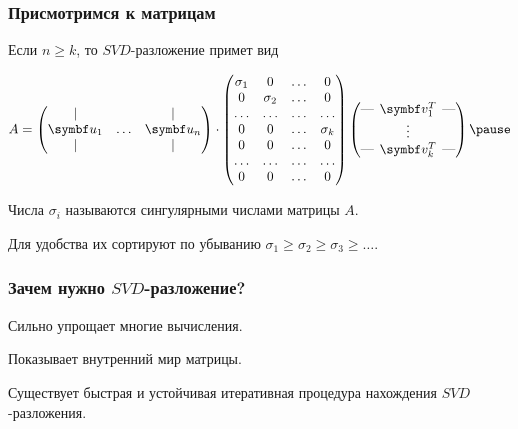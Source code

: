 \begin{frame}
  \frametitle{Присмотримся к матрицам}

  Если $n\geq k$, то $SVD$-разложение примет вид

  \[
  A = \begin{pmatrix}
    \vert &  & \vert \\
    \bu_1 & \ldots & \bu_n \\
    \vert &    & \vert \\
  \end{pmatrix} \cdot 
  \begin{pmatrix}
    \sigma_1 & 0 & \ldots & 0 \\
     0 & \sigma_2 & \ldots & 0 \\
    \ldots & \ldots & \ldots & \ldots \\
0 & 0 & \ldots & \sigma_k \\
0 & 0 & \ldots & 0 \\
\ldots & \ldots & \ldots & \ldots \\
0 & 0 & \ldots & 0 \\
  \end{pmatrix} \begin{pmatrix}
\text{—}  \hspace{-0.2cm} & \bv_1^T & \hspace{-0.2cm}  \text{—} \\
 & \vdots &  \\
\text{—}  \hspace{-0.2cm} & \bv_k^T & \hspace{-0.2cm}  \text{—} \\
   \end{pmatrix} \pause
  \]

  Числа $\sigma_i$ называются \alert{сингулярными} числами матрицы $A$.

  Для удобства их сортируют по убыванию $\sigma_1 \geq \sigma_2 \geq \sigma_3 \geq \ldots$.
  
\end{frame}


\begin{frame}
  \frametitle{Зачем нужно $SVD$-разложение?}

  Сильно упрощает многие вычисления.  \pause

  Показывает внутренний мир матрицы. \pause

  Существует быстрая и устойчивая итеративная процедура нахождения $SVD$-разложения. 

\end{frame}

